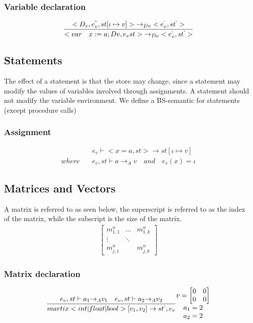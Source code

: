 \subsubsection{Variable declaration}
\begin{equation}
	\frac { <{ D }_{ v },{ e }_{ v }^{ `` },st[\iota \mapsto v]>{ \rightarrow  }_{ Dv }<{ e }_{ v }^{ ` },{ st }^{ ` }> }{ <var\quad x:=a;Dv,{ e }_{ v }st>{ \rightarrow  }_{ Dv }<{ e }_{ v }^{ ` },{ st }^{ ` }> }
\end{equation}

\subsection*{Statements}
The effect of a statement is that the store may change, since a statement may modify the values of variables involved through assignments.
A statement should not modify the variable environment.
We define a BS-semantic for statements (except procedure calls)

\subsubsection{Assignment}
\begin{align*}
	&{ e }_{ v }\vdash <x=a,st>\rightarrow st[\iota \mapsto v]\\
	where\quad &{ e }_{ v },st\vdash a{ \rightarrow  }_{ A }v\quad and\quad  { e }_{ v }(x)=\iota 
\end{align*}

\subsection*{Matrices and Vectors}
A matrix is referred to as seen below, the superscript is referred to as the index of the matrix, while the subscript is the size of the matrix.
\begin{align*}
	\begin{bmatrix} { { m }_{ 1,1 }^{ n } } & \dots  & { m }_{ 1,k }^{ n } \\ \vdots  & \ddots  &  \\ { m }_{ j,1 }^{ n } &  & { m }_{ j,k }^{ n } \end{bmatrix}
\end{align*}

\subsubsection{Matrix declaration}
\begin{equation}
	\frac { { e }_{ v },st\vdash { a }_{ 1 }{ \rightarrow  }_{ A }{ v }_{ 1 }\quad { e }_{ v },st\vdash { a }_{ 2 }{ \rightarrow  }_{ A }{ v }_{ 2 } }{ martix<int|float|bool>[{ v }_{ 1 },{ v }_{ 2 }]\rightarrow { st }^{ ` },{ e }_{ v } } \begin{matrix} v=\begin{bmatrix} 0 & 0 \\ 0 & 0 \end{bmatrix} \\ { a }_{ 1 }=2 \\ { a }_{ 2 }=2 \end{matrix}
	\end{equation}

